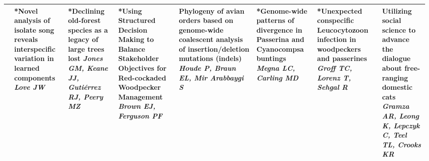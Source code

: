 \begin{tabular}{|x{0.85cm}|x{2.85cm}|x{2.85cm}|x{2.85cm}|x{2.85cm}|a{2.85cm}|x{2.85cm}|a{2.85cm}|}
&*Novel analysis of isolate song reveals interspecific variation in learned components \newline \newline \textit{Love JW} & *Declining old-forest species as a legacy of large trees lost \newline \newline \textit{Jones GM, Keane JJ, Guti\'{e}rrez RJ, Peery MZ} & *Using Structured Decision Making to Balance Stakeholder Objectives for Red-cockaded Woodpecker Management \newline \newline \textit{Brown EJ, Ferguson PF} & Phylogeny of avian orders based on genome-wide coalescent analysis of insertion/deletion mutations (indels) \newline \newline \textit{Houde P, Braun EL, Mir Arabbaygi S} & *Genome-wide patterns of divergence in Passerina and Cyanocompsa buntings \newline \newline \textit{Megna LC, Carling MD} & *Unexpected conspecific Leucocytozoon infection in woodpeckers and passerines \newline \newline \textit{Groff TC, Lorenz T, Sehgal R} & Utilizing social science to advance the dialogue about free-ranging domestic cats \newline \newline \textit{Gramza AR, Leong K, Lepczyk C, Teel TL, Crooks KR}\\
\hline

\end{tabular}
